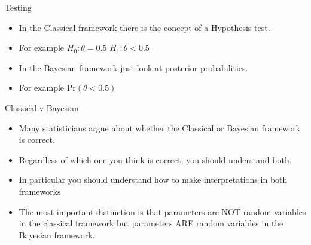 \documentclass[10pt]{beamer}
\begin{document}
\begin{frame}{Testing}
  \begin{itemize}
  \item In the Classical framework there is the concept of a Hypothesis test.

  \item For example $H_0:\theta=0.5$ $H_1:\theta<0.5$

  \item In the Bayesian framework just look at posterior probabilities.

  \item For example $\mbox{Pr}(\theta<0.5)$
  \end{itemize}
\end{frame}
\begin{frame}{Classical v Bayesian}
  \begin{itemize}
  \item Many statisticians argue about whether the Classical or Bayesian framework is correct.

  \item Regardless of which one you think is correct, you should understand both.

  \item In particular you should understand how to make interpretations in both frameworks.

  \item The most important distinction is that parameters are NOT random variables in the classical framework but parameters ARE random variables in the Bayesian framework.
  \end{itemize}
\end{frame}
\end{document}
